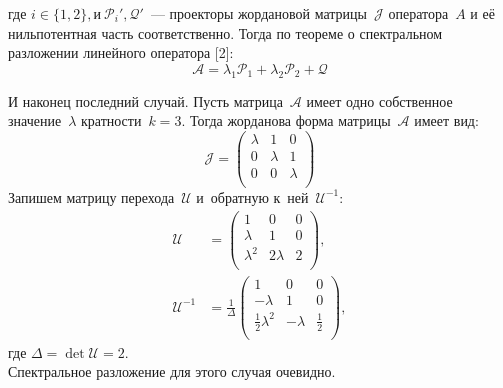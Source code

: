 где $i \in \{1,2\}, \text{и}\  \mathcal{P}_i', \mathcal{Q}'$~--- проекторы жордановой матрицы~$\mathcal{J}$ 
оператора~$A$ и её нильпотентная часть соответственно. Тогда по теореме о спектральном разложении линейного оператора [2]:
$$
	\mathcal{A} = \lambda_1\mathcal{P}_1 + \lambda_2\mathcal{P}_2 + \mathcal{Q} 
$$

И наконец последний случай.		
Пусть матрица~$\mathcal{A}$ имеет одно собственное значение~$\lambda$ 
кратности~$k=3$. Тогда жорданова форма матрицы~$\mathcal{A}$ имеет вид:
$$
 \mathcal{J} = 
 \begin{pmatrix}
  \lambda & 1 & 0\\
  0 & \lambda & 1 \\
  0 & 0 & \lambda \\
 \end{pmatrix}
$$
Запишем матрицу перехода~$\mathcal{U}$ и~обратную к~ней~$\mathcal{U}^{-1}$:
$$
\begin{aligned}
 \mathcal{U} &= 
 \begin{pmatrix}
  	1 & 0 & 0\\
  	\lambda & 1 & 0 \\
  	\lambda^2 & 2\lambda & 2 \\
 \end{pmatrix}, \\
 \mathcal{U}^{-1} &= \frac{1}{\Delta} 
 \begin{pmatrix}
  	1 & 0 & 0  \\
  	-\lambda & 1 & 0  \\
  	\frac{1}{2}\lambda^2 & -\lambda & \frac{1}{2} \\
 \end{pmatrix},
\end{aligned}
$$
где $\Delta = \det \mathcal{U} = 2$. \\
Спектральное разложение для этого случая очевидно.